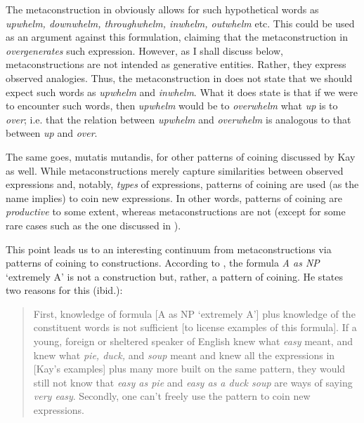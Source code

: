 \documentclass[output=paper, colorlinks,citecolor=brown]{langsci/langscibook}
\begin{document}
\begin{sloppypar}
The metaconstruction in  obviously allows for such hypothetical words as \textit{upwhelm, downwhelm, throughwhelm, inwhelm, outwhelm} etc. This could be used as an argument against this formulation, claiming that the metaconstruction in  \textit{overgenerates} such expression. However, as I shall discuss below, metaconstructions are not intended as generative entities. Rather, they express observed analogies. Thus, the metaconstruction in  does not state that we should expect such words as \textit{upwhelm} and \textit{inwhelm}. What it does state is that if we were to encounter such words, then \textit{upwhelm} would be to \textit{overwhelm} what \textit{up} is to \textit{over}; i.e. that the relation between \textit{upwhelm} and \textit{overwhelm} is analogous to that between \textit{up} and \textit{over}.
\end{sloppypar}

The same goes, mutatis mutandis, for other patterns of coining discussed by Kay as well. While metaconstructions merely capture similarities between observed expressions and, notably, \textit{types} of expressions, patterns of coining are used (as the name implies) to coin new expressions. In other words, patterns of coining are \textit{productive} to some extent, whereas metaconstructions are not (except for some rare cases such as the one discussed in ).

This point leads us to an interesting continuum from metaconstructions via patterns of coining to constructions. According to \citet[38]{Kay2013}, the formula \textit{A as NP} ‘extremely A’ is not a construction but, rather, a pattern of coining. He states two reasons for this (ibid.):

\begin{quote}
First, knowledge of formula  [A as NP ‘extremely A’] plus knowledge of the constituent words is not sufficient [to license examples of this formula]. If a young, foreign or sheltered speaker of English knew what \textit{easy} meant, and knew what \textit{pie, duck,} and \textit{soup} meant and knew all the expressions in [Kay’s examples] plus many more built on the same pattern, they would still not know that \textit{easy as pie} and \textit{easy as a duck soup} are ways of saying \textit{very easy}. Secondly, one can’t freely use the pattern to coin new expressions.
\end{quote}
\end{document}

